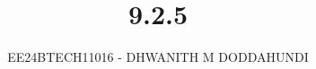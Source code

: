 \documentclass[journal]{IEEEtran}
\begin{document}

\vspace{3cm}

\title{9.2.5}
\author{EE24BTECH11016 - DHWANITH M DODDAHUNDI}
{\let\newpage\relax\maketitle}

\renewcommand{\thefigure}{\theenumi}
\renewcommand{\thetable}{\theenumi}
\setlength{\intextsep}{10pt} %


\renewcommand{\thetable}{\theenumi}
\end{document}
